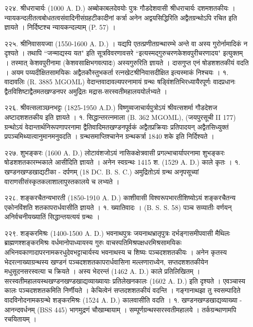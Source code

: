 २२४. श्रीधराचार्यः (1000 A. D.)
अब्बोकाबलदेवयोः पुत्रः गौडदेशवासी श्रीधराचार्यः दशमशतकीयः । न्यायकन्दलीतत्वबोधतत्वसंवादिनीसंग्रहटीकादीनां कर्त्रा अनेन अद्वयसिद्धिरिति अद्वैतग्रन्थोऽपि रचित इति ज्ञायते । निर्दिष्टश्च न्यायकन्दल्याम् (P. 57) ।

२२५. श्रीनिवासयज्वा (1550-1600 A. D.) ।
यद्यपि एतत्प्रणीतग्रन्थारम्भे अन्ते वा अस्य गुरोर्नामादिकं न दृश्यते । तथापि ``जन्माद्यस्य यत" इति सूत्रविवरणावसरे ``इत्यस्मद्गुरुचरणकेशवपुरीचरणादय" इत्युक्तम् । तस्मात् केशवपुरीनामा (केशवसाक्षिभगवत्पादः) अस्यगुरुरिति ज्ञायते । दासगुप्त एनं षोडशशतकीयं वदति । अयम पय्यदीक्षितसामयिकः अद्वैतकौस्तुभकर्ता रत्नखेटश्रीनिवासदीक्षित इत्यस्माकं निश्चयः ।
१. वादावलिः (R. 3885 MGOML)
वेदान्तवादावल्यपरनामायं ग्रन्थः षड्विंशतिभिरध्यायैरपूर्णः वादप्रधानः द्वैतविशिष्टाद्वैतमतखण्डनपर अमुद्रितः मद्रास-सरस्वतीमहालययोर्लभ्यते ।

२२६. श्रीवत्सलाञ्छनभट्टः (1825-1950 A.D.)
विष्णुव्वजाचार्यपुत्रोऽयं श्रीवत्सशर्मा गौडदेशज अष्टादशशतकीय इति ज्ञायते ।
१. सिद्धान्तरत्नमाला (B. 362 MGOML), (जयपुरसूची II 177) ग्रन्थोऽयं वेदान्तार्थनिरूपणापरनामा द्वैतिवादिमतखण्डनपूर्वकं अद्वैतप्रक्रियाः प्रतिपादयन् अद्वैतसिध्युक्तं प्रपञ्चमिथ्यात्वानुमानमनुवदति । ग्रन्थसमाप्तिश्चानेन ग्रन्थकर्त्रा 1840 शके इति निर्दिश्यते ।

२२७. शुभङ्करः (1600 A. D.)
लोटावंशजोऽयं नासिकक्षेत्रवासी प्रगल्भाचार्यापरनामा शुभङ्करः षोडशशतकारम्भकाले आसीदिति ज्ञायते । अनेन स्वग्रन्थः 1415 श. (1529 A. D.) काले कृतः ।
१. खण्डनखण्डखाद्यटीका - दर्पणम् (18 DC. B. S. C.)
अमुद्रितोऽयं ग्रन्थ अनृपसूच्यां वाराणसीसंस्कृतकलाशालापुस्तकालये च लभ्यते ।

२२८. शङ्करचैतन्यभारती (1850-1910 A. D.)
काशीवासी विश्वरूपभारतीशिष्योऽयं शङ्करचैतन्य एकोनविंशति शतकापरार्धवासीति ज्ञायते ।
१. ख्यातिवादः । (B. S. S. 58) पञ्च सव्यातीः वर्णयन् अनिर्वचनीयख्यातिं सिद्धान्तयत्ययं ग्रन्थः ।

२२९. शङ्करमिश्रः (1400-1500 A. D.)
भवनाथपुत्रः जयनाथभ्रातृपुत्रः दर्भङ्गासमीपवासी मैथिलः ब्राह्मणश्शङ्करमिश्रः वर्धमानोपाध्यायस्य गुरुः वाचस्पतिमिश्रपक्षधरमिश्रसामयिकः अभिनवकाणादापरनामकरधुदेवभट्टाचार्यस्य भवनाथस्य च शिष्यः पञ्चदशशतकीयः । अनेन कृतस्य भेदरत्नाख्याग्रन्थस्य खण्डनं पञ्चदशशतकापरार्धवासिना मल्लणाराध्येन, सप्तदशशतकीयेन मधुसूदनसरस्वत्या च क्रियते । अस्य भेदरन्तं (1462 A. D.) काले प्रतिलिखितम् । सरस्वतीमहालयस्थखण्डनखण्डखाद्यव्याख्यायाः प्रतिलेखनकालः (1602 A. D.) इति दृश्यते । एवञ्चास्य कालः पञ्चदशशतकमिति निर्णीयते । केचित्वेनं सप्तदशशतकीयं वदन्ति । गङ्गानाथझा तु स्वसम्पादिते वादविनोदनामकग्रन्थे शङ्करमिश्रः (1524 A. D.) कालवासीति वदति ।
१. खण्डनखण्डखाद्यव्याख्या - आनन्दवर्धनम् (BSS 445) भागमुद्रणं चौखाम्बायाम् । सम्पूर्णग्रन्थस्सरस्वतीमहालये । तर्कग्रन्थाणामपि रचयितायम् ।

